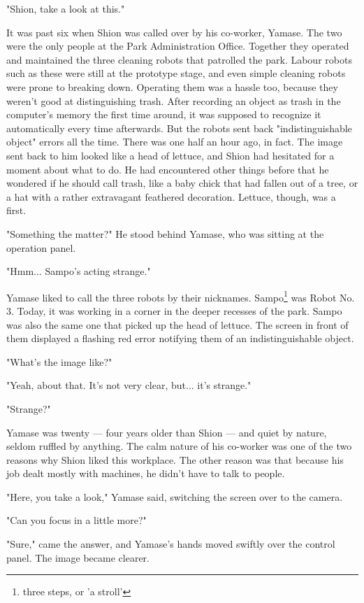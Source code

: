 \myspace

"Shion, take a look at this."

It was past six when Shion was called over by his co-worker, Yamase. The
two were the only people at the Park Administration Office. Together
they operated and maintained the three cleaning robots that patrolled
the park. Labour robots such as these were still at the prototype stage,
and even simple cleaning robots were prone to breaking down. Operating
them was a hassle too, because they weren't good at distinguishing
trash. After recording an object as trash in the computer's memory the
first time around, it was supposed to recognize it automatically every
time afterwards. But the robots sent back "indistinguishable object"
errors all the time. There was one half an hour ago, in fact. The image
sent back to him looked like a head of lettuce, and Shion had hesitated
for a moment about what to do. He had encountered other things before
that he wondered if he should call trash, like a baby chick that had
fallen out of a tree, or a hat with a rather extravagant feathered
decoration. Lettuce, though, was a first.

"Something the matter?" He stood behind Yamase, who was sitting at the
operation panel.

"Hmm... Sampo's acting strange."

Yamase liked to call the three robots by their nicknames. Sampo\footnote{three steps, or 'a stroll'} was
Robot No. 3. Today, it was working in a corner in the deeper recesses of
the park. Sampo was also the same one that picked up the head of
lettuce. The screen in front of them displayed a flashing red error
notifying them of an indistinguishable object.

"What's the image like?"

"Yeah, about that. It's not very clear, but... it's strange."

"Strange?"

Yamase was twenty --- four years older than Shion --- and quiet by nature,
seldom ruffled by anything. The calm nature of his co-worker was one of
the two reasons why Shion liked this workplace. The other reason was
that because his job dealt mostly with machines, he didn't have to talk
to people.

"Here, you take a look," Yamase said, switching the screen over to the
camera.

"Can you focus in a little more?"

"Sure," came the answer, and Yamase's hands moved swiftly over the
control panel. The image became clearer.

